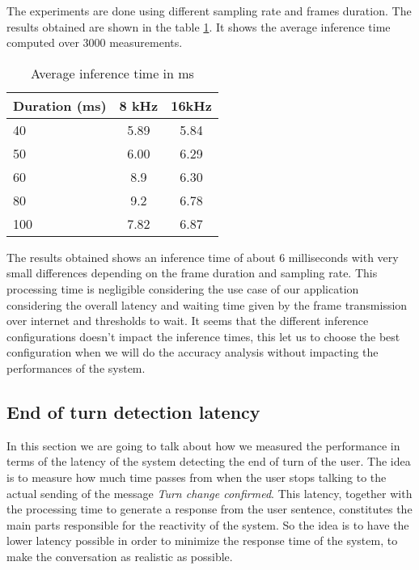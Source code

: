 \documentclass[../main.tex]{subfiles}
\begin{document}
The experiments are done using different sampling rate and frames duration. The results obtained are shown in the table \ref{tab:inference time}. It shows the average inference time computed over 3000 measurements.

\begin{table}[ht]
    \centering
    \begin{tabular}{|l|c|c|} \hline 
         Duration (ms)& 8 kHz &16kHz\\ \hline 
         40&  5.89&5.84\\ \hline 
         50&  6.00&6.29\\ \hline 
         60&  8.9&6.30\\ \hline 
         80&  9.2&6.78\\ \hline 
         100&  7.82&6.87\\ \hline
    \end{tabular}
    \caption{Average inference time in ms}
    \label{tab:inference time}
\end{table}

The results obtained shows an inference time of about 6 milliseconds with very small differences depending on the frame duration and sampling rate. This processing time is negligible considering the use case of our application considering the overall latency and waiting time given by the frame transmission over internet and thresholds to wait. It seems that the different inference configurations doesn't impact the inference times, this let us to choose the best configuration when we will do the accuracy analysis without impacting the performances of the system.

\subsection{End of turn detection latency}

In this section we are going to talk about how we measured the performance in terms of the latency of the system detecting the end of turn of the user. The idea is to measure how much time passes from when the user stops talking to the actual sending of the message \textit{Turn change confirmed}. This latency, together with the processing time to generate a response from the user sentence, constitutes the main parts responsible for the reactivity of the system. So the idea is to have the lower latency possible in order to minimize the response time of the system, to make the conversation as realistic as possible.
\end{document}

